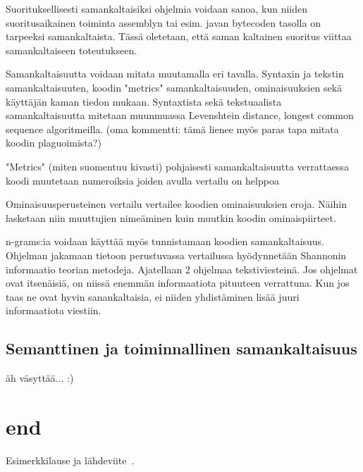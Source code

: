 \documentclass[finnish]{tktltiki2}
\theoremstyle{definition}
\theoremstyle{remark}
\begin{document}
Suorituksellisesti samankaltaisiksi ohjelmia voidaan sanoa, kun niiden suoritusaikainen toiminta assemblyn tai esim. javan bytecoden tasolla on tarpeeksi samankaltaista. Tässä oletetaan, että saman kaltainen suoritus viittaa samankaltaiseen toteutukseen.


Samankaltaisuutta voidaan mitata muutamalla eri tavalla. Syntaxin ja tekstin samankaltaisuuten, koodin "metrics" samankaltaisuuden, ominaisuuksien  sekä käyttäjän kaman tiedon mukaan.
Syntaxtista sekä tekstuaalista samankaltaisuutta mitetaan muunmuassa Levenshtein distance, longest common sequence algoritmeilla. (oma kommentti: tämä lienee myös paras tapa mitata koodin plaguoimista?)

"Metrics" (miten suomentuu kivasti) pohjaisesti samankaltaisuutta verrattaessa koodi muutetaan numeroiksia joiden avulla vertailu on helppoa

Ominaisuusperusteinen vertailu vertailee koodien ominaisuuksien eroja. Näihin lasketaan niin muuttujien nimeäminen kuin muutkin koodin ominaispiirteet.

n-grams:ia voidaan käyttää myös tunnistamaan koodien samankaltaisuus.
Ohjelman jakamaan tietoon perustuvassa vertailussa hyödynnetään Shannonin informaatio teorian metodeja. Ajatellaan 2 ohjelmaa tekstiviesteinä. Jos ohjelmat ovat itsenäisiä, on niissä enemmän informaatiota pituuteen verrattuna. Kun jos taas ne ovat hyvin sanankaltaisia, ei niiden yhdistäminen lisää juuri informaatiota viestiin.


\subsection{Semanttinen ja toiminnallinen samankaltaisuus}
äh väsyttää... :)


\section{end}
Esimerkkilause ja lähdeviite~\cite{esimerkki}.


%
%
% 
%







% 
\end{document}
